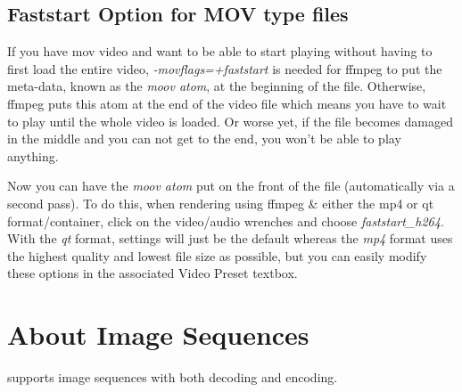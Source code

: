 \subsection{Faststart Option for MOV type files}%
\label{sub:faststart_option_mov0}

If you have mov video and want to be able to start playing without
having to first load the entire video, \textit{-movflags=+faststart}
is needed for ffmpeg to put the meta-data, known as the \textit{moov
	atom}, at the beginning of the file.  Otherwise, ffmpeg puts this
atom at the end of the video file which means you have to wait to
play until the whole video is loaded.  Or worse yet, if the file
becomes damaged in the middle and you can not get to the end, you
won’t be able to play anything.

Now you can have the \textit{moov atom} put on the front of the file
(automatically via a second pass).  To do this, when rendering using
ffmpeg \& either the mp4 or qt format/container, click on the
video/audio wrenches and choose \textit{faststart\_h264}.  With the
\textit{qt} format, settings will just be the default whereas the
\textit{mp4} format uses the highest quality and lowest file size as
possible, but you can easily modify these options in the associated
Video Preset textbox.

\section{About Image Sequences}%
\label{sec:about_image_sequences}

\CGG{} supports image sequences with both decoding and encoding.

